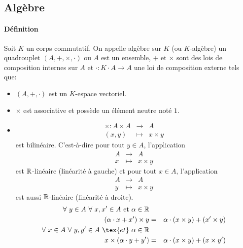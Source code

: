 %
\subsection{Algèbre}
%
\paragraph{Définition} Soit $K$ un corps commutatif. On appelle algèbre sur $K$ (ou $K$-algèbre) un quadrouplet $(A, +, \times, \cdot)$ ou $A$ est un ensemble, $+$ et $\times$ sont des lois de composition internes sur $A$ et $\cdot: K \cdot A \rightarrow A$ une loi de composition externe tels que:
\begin{itemize}
  \item $(A, +, \cdot)$ est un $K$-espace vectoriel.
  \item $\times$ est associative et possède un élément neutre noté $1$.
  \item 
    \begin{eqnarray*}
      \times: A \times A &\rightarrow& A \\
      (x, y) &\mapsto& x \times y
    \end{eqnarray*}
    est bilinéaire. C'est-à-dire pour tout $y \in A$, l'application
      \begin{eqnarray*}
        A &\rightarrow& A \\
        x &\mapsto& x \times y
      \end{eqnarray*}
      est $\mathbb{R}$-linéaire (linéarité à gauche) et pour tout $x \in A$, l'application
      \begin{eqnarray*}
        A &\rightarrow& A \\
        y &\mapsto& x \times y
      \end{eqnarray*}
      est aussi $\mathbb{R}$-linéaire (linéarité à droite).
      \begin{eqnarray*}
        \forall~ y \in A ~\forall~ x, x' \in A ~\text{et}~ \alpha \in \R \\
          (\alpha \cdot x + x') \times y &=& \alpha \cdot (x \times y) + (x' \times y) \\
        \forall~ x \in A ~\forall~ y, y' \in A ~\tex{et}~ \alpha \in \R \\
          x \times (\alpha \cdot y + y') &=& \alpha \cdot (x \times y) + (x \times y') \\
      \end{eqnarray*}
\end{itemize}

